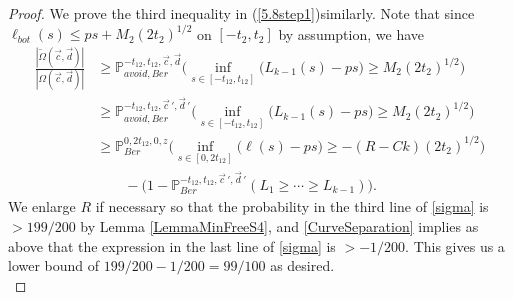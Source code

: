 \begin{proof}
	We prove the third inequality in (\ref{5.8step1})similarly. Note that since $\ell_{bot}(s) \leq ps + M_2(2t_2)^{1/2}$ on $[-t_2,t_2]$ by assumption, we have
	\begin{equation} \label{sigma}
	\begin{split}
	\frac{|\tilde{\Omega}(\vec{c},\vec{d})|}{|\Omega(\vec{c},\vec{d})|} &\geq \mathbb{P}^{-t_{12}, t_{12}, \vec{c},\vec{d}}_{avoid, Ber}\Big(\inf_{s\in[-t_{12}, t_{12}]} \big(L_{k-1}(s) - ps\big) \geq M_2(2t_2)^{1/2}\Big)\\
	&\geq \mathbb{P}^{-t_{12}, t_{12}, \vec{c}\,',\vec{d}\,'}_{avoid, Ber}\Big(\inf_{s\in[-t_{12}, t_{12}]} \big(L_{k-1}(s) - ps\big) \geq M_2(2t_2)^{1/2}\Big)\\
	&\geq \mathbb{P}^{0, 2t_{12}, 0, z}_{Ber}\Big(\inf_{s\in[0, 2t_{12}]} \big(\ell(s) - ps\big) \geq -(R-Ck)(2t_2)^{1/2}\Big)\\
	&\qquad - \big(1 - \mathbb{P}^{-t_{12},t_{12},\vec{c}\,',\vec{d}\,'}_{Ber}(L_1\geq \cdots \geq L_{k-1})\big).
	\end{split}
	\end{equation}
	We enlarge $R$ if necessary so that the probability in the third line of \eqref{sigma} is $>199/200$ by Lemma \ref{LemmaMinFreeS4}, and \ref{CurveSeparation} implies as above that the expression in the last line of \eqref{sigma} is $>-1/200$. This gives us a lower bound of $199/200 - 1/200 = 99/100$ as desired.\\
	

\end{proof}
